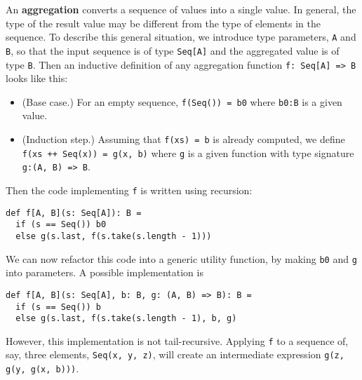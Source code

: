 An \textbf{aggregation} converts a sequence of
values into a single value. In general, the type of the result value
may be different from the type of elements in the sequence. To describe
this general situation, we introduce type parameters, \lstinline!A!
and \lstinline!B!, so that
the input sequence is of type \lstinline!Seq[A]!
and the aggregated value is of type \lstinline!B!.
Then an inductive definition of any aggregation function \lstinline!f: Seq[A] => B!
looks like this:
\begin{itemize}
\item (Base case.) For an empty sequence, \lstinline!f(Seq()) = b0!
where \lstinline!b0:B!
is a given value.
\item (Induction step.) Assuming that \lstinline!f(xs) = b!
is already computed, we define \lstinline!f(xs ++ Seq(x)) = g(x, b)!
where \lstinline!g! is
a given function with type signature \lstinline!g:(A, B) => B!.
\end{itemize}
Then the code implementing \lstinline!f!
is written using recursion:
\begin{lstlisting}
def f[A, B](s: Seq[A]): B =
  if (s == Seq()) b0
  else g(s.last, f(s.take(s.length - 1)))
\end{lstlisting}
We can now refactor this code into a generic utility function, by
making \lstinline!b0! and
\lstinline!g! into parameters.
A possible implementation is
\begin{lstlisting}
def f[A, B](s: Seq[A], b: B, g: (A, B) => B): B =
  if (s == Seq()) b
  else g(s.last, f(s.take(s.length - 1), b, g)
\end{lstlisting}
However, this implementation is not tail-recursive. Applying \lstinline!f!
to a sequence of, say, three elements, \lstinline!Seq(x, y, z)!,
will create an intermediate expression \lstinline!g(z, g(y, g(x, b)))!.
